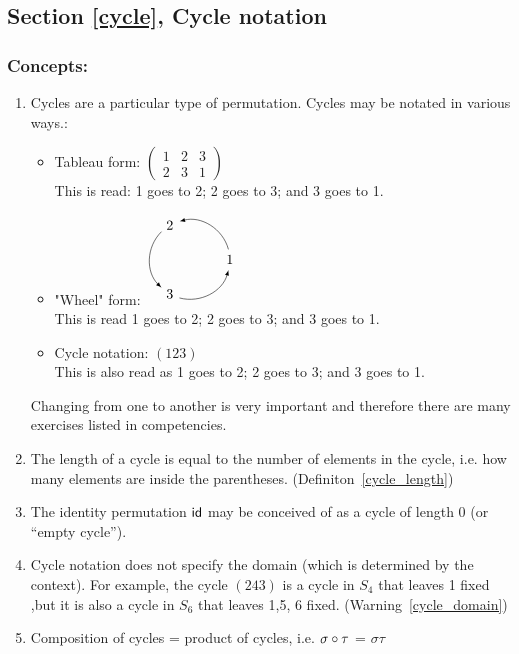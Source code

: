 \subsection*{Section \ref{cycle}, Cycle notation}
\subsubsection*{Concepts:}
\begin{enumerate}
\item 
Cycles are a particular type of permutation.  Cycles may be notated in various ways.:
	\begin{itemize}
	\item
	Tableau form: 
	$\begin{pmatrix} 1 & 2 & 3\\ 2 & 3 & 1\end{pmatrix}$\\
	This is read: 1 goes to 2; 2 goes to 3; and 3 goes to 1.
	\item
	"Wheel" form: \quad
	$\begin{tikzpicture}
	\def \n {3}
	\def \radius {1cm}
	\def \margin {15} 
	\foreach \s in {1,...,\n}
	{
 	 \node at ({360/\n * (\s - 1)}:\radius) {$\s$};
	  \draw[->, >=latex] ({360/\n * (\s - 1)+\margin}:\radius) 
 	   arc ({360/\n * (\s - 1)+\margin}:{360/\n * (\s)-\margin}:\radius);
	}
	\end{tikzpicture}$\\
	This is read 1 goes to 2; 2 goes to 3; and 3 goes to 1.
	\item
	Cycle notation: $(123)$\\
	This is also read as 1 goes to 2; 2 goes to 3; and 3 goes to 1.
	\end{itemize}
Changing from one to another is very important and therefore there are many exercises listed in competencies.
\item
The length of a cycle is equal to the number of elements in the cycle, i.e. how many elements are inside the parentheses. (Definiton~\ref{cycle_length})
\item
The  identity permutation $\sf{id}$ may be conceived of as a cycle of length 0 (or ``empty cycle'').
\item
Cycle notation does not specify the domain (which is determined by the context).  For example, the cycle $(243)$ is a cycle in $S_4$ that leaves  1 fixed ,but it is also a cycle in $S_6$ that leaves 1,5, 6 fixed. (Warning~\ref{cycle_domain})
\item
Composition of cycles = product of cycles, i.e.  $\sigma \circ \tau$ = $\sigma \tau$

\end{enumerate}
